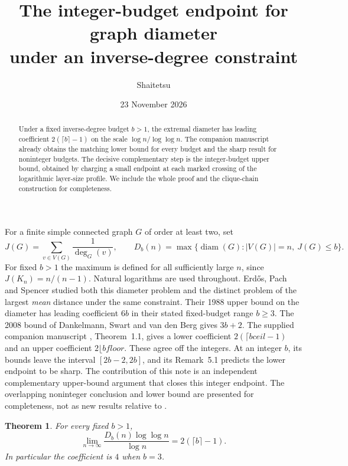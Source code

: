 \documentclass[10pt]{article}
\title{The integer-budget endpoint for graph diameter\protect\\ under an inverse-degree constraint}
\author{Shaitetsu}
\date{23 November 2026}
\newtheorem{theorem}{Theorem}
\DeclareMathOperator{\diam}{diam}
\begin{document}
\maketitle
\begin{abstract}
Under a fixed inverse-degree budget $b>1$, the extremal diameter has leading coefficient $2(\lceil b\rceil-1)$ on the scale $\log n/\log\log n$.
The companion manuscript already obtains the matching lower bound for every budget and the sharp result for noninteger budgets. The decisive complementary step is the integer-budget upper bound, obtained by charging a small endpoint at each marked crossing of the logarithmic layer-size profile. We include the whole proof and the clique-chain construction for completeness.
\end{abstract}

For a finite simple connected graph $G$ of order at least two, set
\[
 J(G)=\sum_{v\in V(G)}\frac{1}{\deg_G(v)},\qquad
 D_b(n)=\max\{\diam(G):|V(G)|=n,\ J(G)\le b\}.
\]
For fixed $b>1$ the maximum is defined for all sufficiently large $n$, since $J(K_n)=n/(n-1)$. Natural logarithms are used throughout. Erd\H{o}s, Pach and Spencer \cite{eps} studied both this diameter problem and the distinct problem of the largest \emph{mean} distance under the same constraint. Their 1988 upper bound on the diameter has leading coefficient $6b$ in their stated fixed-budget range $b\ge3$. The 2008 bound of Dankelmann, Swart and van den Berg \cite{dsv,li} gives $3b+2$. The supplied companion manuscript \cite{companion}, Theorem~1.1, gives a lower coefficient $2(\lceil b
ceil-1)$ and an upper coefficient $2\lfloor b
floor$. These agree off the integers. At an integer $b$, its bounds leave the interval $[2b-2,2b]$, and its Remark~5.1 predicts the lower endpoint to be sharp. The contribution of this note is an independent complementary upper-bound argument that closes this integer endpoint. The overlapping noninteger conclusion and lower bound are presented for completeness, not as new results relative to \cite{companion}.

\begin{theorem}\label{thm:main}
For every fixed $b>1$,
\[
 \lim_{n\to\infty}\frac{D_b(n)\log\log n}{\log n}
 =2(\lceil b\rceil-1).
\]
In particular the coefficient is $4$ when $b=3$.
\end{theorem}
\end{document}
